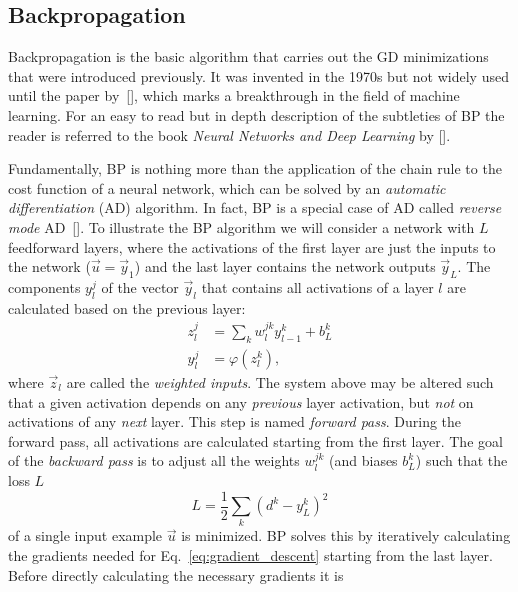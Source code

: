\subsection{Backpropagation}%
\label{sub:backpropagation}

Backpropagation is the basic algorithm that carries out the GD minimizations
that were introduced previously. It was invented in the 1970s but not widely
used until the paper by~[\cite{rumelhart1986}], which marks a breakthrough in the
field of machine learning.  For an easy to read but in depth description of the
subtleties of BP the reader is referred to the book \emph{Neural Networks and
Deep Learning} by [\cite{Nielsen2015}].

Fundamentally, BP is nothing more than the application of the chain rule to the
cost function of a neural network, which can be solved by an \emph{automatic
differentiation} (AD) algorithm. In fact, BP is a special case of AD called
\emph{reverse mode} AD~[\cite{autodiff}].  To illustrate the BP algorithm we will
consider a network with $L$ feedforward layers, where the activations of the
first layer are just the inputs to the network ($\vec{u} = \vec{y}_1$) and the
last layer contains the network outputs $\vec{y}_L$. The components $y^j_l$ of
the vector $\vec{y}_l$ that contains all activations of a layer $l$ are
calculated based on the previous layer:
\begin{equation}
\begin{aligned}
  z^j_l &= \sum_k w^{jk}_l y^k_{l-1} + b^k_L \\
  y^j_l &= \varphi(z^k_l) \label{eq:forward_pass},
\end{aligned}
\end{equation}
where $\vec{z}_l$ are called the \emph{weighted inputs}.  The system above may
be altered such that a given activation depends on any \emph{previous} layer
activation, but \emph{not} on activations of any \emph{next} layer. This step is
named \emph{forward pass}.  During the forward pass, all activations are
calculated starting from the first layer. The goal of the \emph{backward pass}
is to adjust all the weights $w^{jk}_l$ (and biases $b^k_L$) such that the loss $L$
\begin{equation}
  L = \frac{1}{2}\sum_k (d^k - y^k_L)^2
\end{equation}
of a single input example $\vec{u}$ is minimized. BP solves this by iteratively
calculating the gradients needed for Eq.~\ref{eq:gradient_descent} starting
from the last layer.  Before directly calculating the necessary gradients it is
